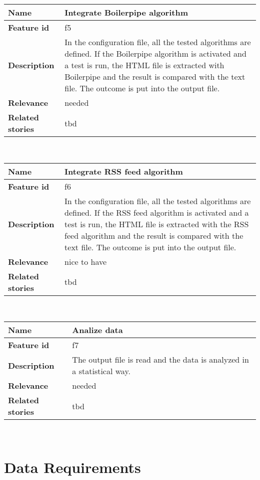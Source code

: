 	\begin{tabular}{ | p{3cm} | p{12cm} |}
	\hline
	\textbf{Name} 				& Integrate Boilerpipe algorithm \\ \hline
	\textbf{Feature id} 		& f5 \\ \hline
	\textbf{Description} 		& In the configuration file, all the tested algorithms are defined. If the Boilerpipe algorithm is activated and a test is run, the HTML file is extracted with Boilerpipe and the result is compared with the text file. The outcome is put into the output file. \\ \hline
	\textbf{Relevance} 			& needed \\ \hline
	\textbf{Related stories} 	& tbd \\ \hline
	\end{tabular} \\

\begin{tabular}{ | p{3cm} | p{12cm} |}
	\hline
	\textbf{Name} 				& Integrate RSS feed algorithm \\ \hline
	\textbf{Feature id} 		& f6 \\ \hline
	\textbf{Description} 		& In the configuration file, all the tested algorithms are defined. If the RSS feed algorithm is activated and a test is run, the HTML file is extracted with the RSS feed algorithm and the result is compared with the text file. The outcome is put into the output file. \\ \hline
	\textbf{Relevance} 			& nice to have\\ \hline
	\textbf{Related stories} 	& tbd \\ \hline
	\end{tabular} \\

	\begin{tabular}{ | p{3cm} | p{12cm} |}
	\hline
	\textbf{Name} 				& Analize data \\ \hline
	\textbf{Feature id} 		& f7 \\ \hline
	\textbf{Description} 		& The output file is read and the data is analyzed in a statistical way.\\ \hline
	\textbf{Relevance} 			& needed \\ \hline
	\textbf{Related stories} 	& tbd \\ \hline
	\end{tabular} \\

\section{Data Requirements}
